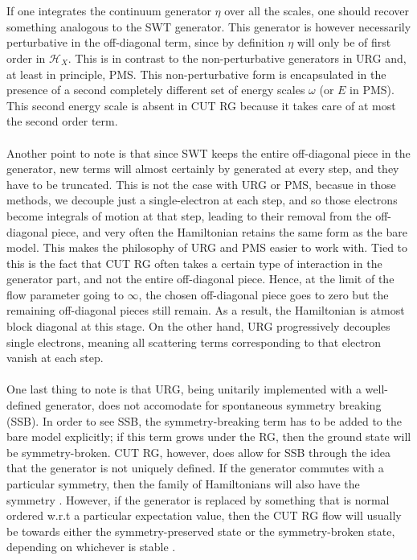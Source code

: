 \documentclass[twoside,11pt]{report}
\numberwithin{equation}{section}
\begin{document}
\\\\If one integrates the continuum generator \(\eta\) over all the scales, one should recover something analogous to the SWT generator. This generator is however necessarily perturbative in the off-diagonal term, since by definition \(\eta\) will only be of first order in \(\mathcal{H}_X\). This is in contrast to the non-perturbative generators in URG and, at least in principle, PMS. This non-perturbative form is encapsulated in the presence of a second completely different set of energy scales \(\omega\) (or \(E\) in PMS). This second energy scale is absent in CUT RG because it takes care of at most the second order term.
\\\\Another point to note is that since SWT keeps the entire off-diagonal piece in the generator, new terms will almost certainly by generated at every step, and they have to be truncated. This is not the case with URG or PMS, becasue in those methods, we decouple just a single-electron at each step, and so those electrons become integrals of motion at that step, leading to their removal from the off-diagonal piece, and very often the Hamiltonian retains the same form as the bare model. This makes the philosophy of URG and PMS easier to work with. Tied to this is the fact that CUT RG often takes a certain type of interaction in the generator part, and not the entire off-diagonal piece. Hence, at the limit of the flow parameter going to \(\infty\), the chosen off-diagonal piece goes to zero but the remaining off-diagonal pieces still remain. As a result, the Hamiltonian is atmost block diagonal at this stage. On the other hand, URG progressively decouples single electrons, meaning all scattering terms corresponding to that electron vanish at each step. 
\\\\One last thing to note is that URG, being unitarily implemented with a well-defined generator, does not accomodate for spontaneous symmetry breaking (SSB). In order to see SSB, the symmetry-breaking term has to be added to the bare model explicitly; if this term grows under the RG, then the ground state will be symmetry-broken. CUT RG, however, does allow for SSB through the idea that the generator is not uniquely defined. If the generator commutes with a particular symmetry, then the family of Hamiltonians will also have the symmetry \cite{kehrein}. However, if the generator is replaced by something that is normal ordered w.r.t a particular expectation value, then the CUT RG flow will usually be towards either the symmetry-preserved state or the symmetry-broken state, depending on whichever is stable \cite{wegner_normal}.
\end{document}
